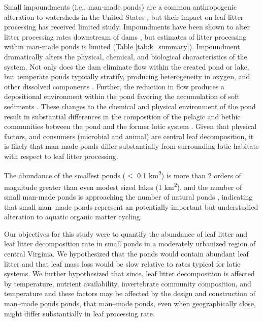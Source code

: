 \documentclass{article}
\begin{document}
Small impoundments (i.e., man-made ponds) are a common anthropogenic alteration to watersheds in the United States \cite{Downing_2006,Downing_2010}, but their impact on leaf litter processing has received limited study. Impoundments have been shown to alter litter processing rates downstream of dams \cite{Short_1980,Mendoza_Lera_2010, Tornwall_2016}, but estimates of litter processing within man-made ponds is limited (Table \ref{tab:k_summary}). Impoundment dramatically alters the physical, chemical, and biological characteristics of the system. Not only does the dam eliminate flow within the created pond or lake, but temperate ponds typically stratify, producing heterogeneity in oxygen, and other dissolved components \cite{WETZEL_2001}. Further, the reduction in flow produces a depositional environment within the pond favoring the accumulation of soft sediments \cite{WETZEL_2001}. These changes to the chemical and physical environment of the pond result in substantial differences in the composition of the pelagic and bethic communities between the pond and the former lotic system \cite{Ogbeibu_2002}. Given that physical factors, and consumers (microbial and animal) are central leaf decomposition, it is likely that man-made ponds differ substantially from surrounding lotic habitats with respect to leaf litter processing.

The abundance of the smallest ponds ($<$ 0.1 km\textsuperscript{2}) is more than 2 orders of magnitude greater than even modest sized lakes (1 km\textsuperscript{2}), and the number of small man-made ponds is approaching the number of natural ponds \cite{Downing_2010}, indicating that small man--made ponds represent an potentially important but understudied alteration to aquatic organic matter cycling.

Our objectives for this study were to quantify the abundance of leaf litter and leaf litter decomposition rate in small ponds in a moderately urbanized region of central Virginia. We hypothesized that the ponds would contain abundant leaf litter and that leaf mass loss would be slow relative to rates typical for lotic systems. We further hypothesized that since, leaf litter decomposition is affected by temperature, nutrient availability, invertebrate community composition, and temperature \cite{Webster_1986} and these factors may be affected by the design and construction of man--made ponds ponds, that man--made ponds, even when geographically close, might differ substantially in leaf processing rate. 
\end{document}
